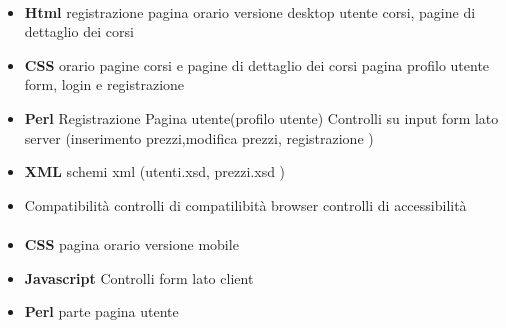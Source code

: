\documentclass[12pt,a4paper]{article}
\begin{document}
\paragraph{\AB{}}
\begin{itemize}
	\item \textbf{Html}
	\subitem registrazione
	\subitem pagina orario versione desktop
	\subitem utente
	\subitem corsi, pagine di dettaglio dei corsi
	\item \textbf{CSS}
	\subitem orario
	\subitem pagine corsi e pagine di dettaglio dei corsi
	\subitem pagina profilo utente
	\subitem form, login e registrazione
	\item \textbf{Perl}
	\subitem Registrazione
	\subitem Pagina utente(profilo utente)
	\subitem Controlli su input form lato server (inserimento prezzi,modifica prezzi, registrazione )
	\item\textbf{XML}
	\subitem schemi xml (utenti.xsd, prezzi.xsd )
	\item Compatibilità
	\subitem controlli di compatilibità browser
	\subitem controlli di accessibilità 
\end{itemize}
\paragraph{\EC{}}
\begin{itemize}
	\item\textbf{CSS}
	\subitem pagina orario versione mobile
	\item\textbf{Javascript}
	\subitem Controlli form lato client
	\item\textbf{ Perl}
	\subitem parte pagina utente
\end{itemize}
\end{document}
